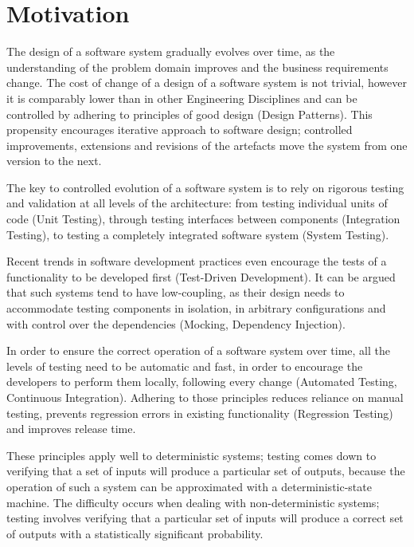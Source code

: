 \section{Motivation}


The design of a software system gradually evolves over time, as the understanding of the problem domain improves and the business requirements change. The cost of change of a design of a software system  is not trivial, however it is comparably lower than in other Engineering Disciplines and can be controlled by adhering to principles of good design (Design Patterns). This propensity encourages iterative approach to software design; controlled improvements, extensions and revisions of the artefacts move the system from one version to the next. 

The key to controlled evolution of a software system is to rely on rigorous testing and validation at all levels of the architecture: from testing individual units of code (Unit Testing), through testing interfaces between components (Integration Testing), to testing a completely integrated software system (System Testing). 

Recent trends in software development practices even encourage the tests of a functionality to be developed first (Test-Driven Development). It can be argued that such systems tend to have low-coupling, as their design needs to accommodate testing components in isolation, in arbitrary configurations and with control over the dependencies (Mocking, Dependency Injection).

In order to ensure the correct operation of a software system over time, all the levels of testing need to be automatic and fast, in order to encourage the developers to perform them locally, following every change (Automated Testing, Continuous Integration). Adhering to those principles reduces reliance on manual testing, prevents regression errors in existing functionality (Regression Testing) and improves release time.

These principles apply well to deterministic systems; testing comes down to verifying that a set of inputs will produce a particular set of outputs, because the operation of such a system can be approximated with a deterministic-state machine. The difficulty occurs when dealing with non-deterministic systems; testing involves verifying that a particular set of inputs will produce a correct set of outputs with a statistically significant probability.

